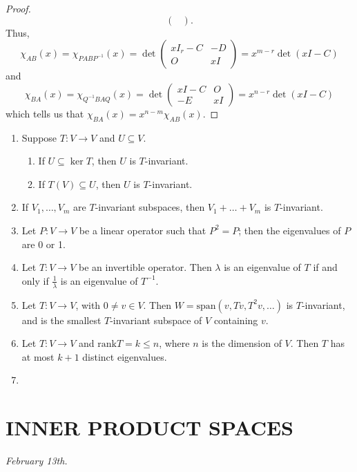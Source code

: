 \documentclass[15pt,a4paper]{book}
\theoremstyle{definition}
\begin{document}
\begin{proof}
\begin{equation}
\begin{pmatrix}
        \end{pmatrix}.
    \end{equation}
    Thus,
    \begin{equation}
        \chi_{AB}(x) = \chi_{PABP^{-1}}(x) = \det \begin{pmatrix}
            xI_{r} - C & -D \\ O & xI
        \end{pmatrix} = x^{m-r} \det(xI-C)
    \end{equation}
    and
    \begin{equation}
        \chi_{BA}(x) = \chi_{Q^{-1}BAQ}(x) = \det \begin{pmatrix}
            xI - C & O \\ -E & xI
        \end{pmatrix} = x^{n-r} \det(xI-C)
    \end{equation}
    which tells us that $\chi_{BA}(x) = x^{n-m} \chi_{AB}(x)$.
\end{proof}

\begin{enumerate}
    \item Suppose $T:V \to V$ and $U \subseteq V$.
    \begin{enumerate}
        \item If $U \subseteq \ker T$, then $U$ is $T$-invariant.
        \item If $T(V) \subseteq U$, then $U$ is $T$-invariant.
    \end{enumerate}
    \item If $V_{1},\ldots,V_{m}$ are $T$-invariant subspaces, then $V_{1} + \ldots + V_{m}$ is $T$-invariant.
    \item Let $P:V \to V$ be a linear operator such that $P^{2} = P$;  then the eigenvalues of $P$ are 0 or 1.
    \item Let $T:V \to V$ be an invertible operator. Then $\lambda$ is an eigenvalue of $T$ if and only if $\frac{1}{\lambda}$ is an eigenvalue of $T^{-1}$.
    \item Let $T:V \to V$, with $0 \neq v \in V$. Then $W = \text{span}(v, Tv, T^{2}v, \ldots)$ is $T$-invariant, and is the smallest $T$-invariant subspace of $V$ containing $v$.
    \item Let $T:V \to V$ and $\text{rank}T = k \leq n$, where $n$ is the dimension of $V$. Then $T$ has at most $k+1$ distinct eigenvalues.
    \item 
\end{enumerate}

\chapter{INNER PRODUCT SPACES}
\textit{February 13th.}
\end{document}
